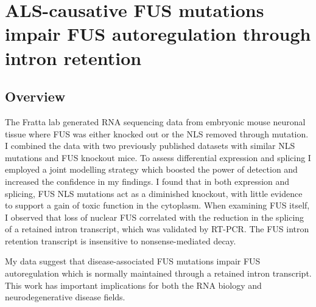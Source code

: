 \chapter{ALS-causative FUS mutations impair FUS autoregulation through intron retention}

\label{chapter:fus_meta}

\section{Overview}


The Fratta lab generated RNA sequencing data from embryonic mouse neuronal tissue where FUS was either knocked out or the NLS removed through mutation. I combined the data with two previously published datasets with similar NLS mutations and FUS knockout mice. To assess differential expression and splicing I employed a joint modelling strategy which boosted the power of detection and increased the confidence in my findings. I found that in both expression and splicing, FUS NLS mutations act as a diminished knockout, with little evidence to support a gain of toxic function in the cytoplasm. When examining FUS itself, I observed that loss of nuclear FUS correlated with the reduction in the splicing of a retained intron transcript, which was validated by RT-PCR. The FUS intron retention transcript is insensitive to nonsense-mediated decay.

My data suggest that disease-associated FUS mutations impair FUS autoregulation which is normally maintained through a retained intron transcript. This work has important implications for both the RNA biology and neurodegenerative disease fields.

